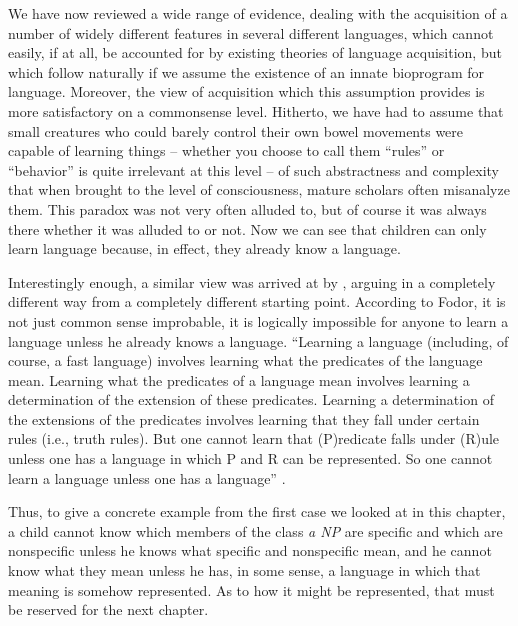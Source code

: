 We have now reviewed a wide range of evidence, dealing with the
acquisition of a number of widely different features in several different languages, which cannot easily, if at all, be accounted for by existing theories of language acquisition, but which follow naturally if we assume the existence of an innate bioprogram for language. Moreover, the view of acquisition which this assumption provides is more satis\-factory on a commonsense level. Hitherto, we have had to assume that small creatures who could barely control their own bowel move\-ments were capable of learning things -- whether you choose to call them ``rules'' or ``behavior'' is quite irrelevant at this level -- of such abstractness and complexity that when brought to the level of consciousness, mature scholars often misanalyze them. This paradox was not very often alluded to, but of course it was always there whether it was alluded to or not. Now we can see that children can only learn language because, in effect, they already know a language.

Interestingly enough, a similar view was arrived at by \citet{Fodor1975}, arguing in a completely different way from a completely different starting point. According to Fodor, it is not just common sense improbable, it is logically impossible for anyone to learn a lan\-guage unless he already knows a language. ``Learning a language (including, of course, a fast language) involves learning what the predicates of the language mean. Learning what the predicates of a language mean involves learning a determination of the extension of these predicates. Learning a determination of the extensions of the predicates involves learning that they fall under certain rules (i.e., truth rules). But one cannot learn that (P)redicate falls under (R)ule unless one has a lan\-guage in which P and R can be represented. So one cannot learn a language unless one has a language'' \citep[63--64]{Fodor1975}.

Thus, to give a concrete example from the first case we looked at in this chapter, a child cannot know which members of the class \textit{a NP} are specific and which are nonspecific unless he knows what specific and nonspecific mean, and he cannot know what they mean unless he has, in some sense, a language in which that meaning is some\-how represented. As to how it might be represented, that must be reserved for the next chapter.


